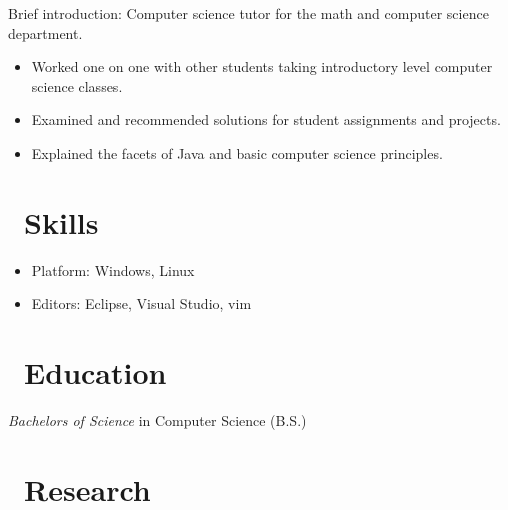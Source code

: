 \documentclass{resume}
\begin{document}
Brief introduction: Computer science tutor for the math and computer science department.
\begin{itemize}
  \item Worked one on one with other students taking introductory level computer science classes.
  \item Examined and recommended solutions for student assignments and projects.
  \item Explained the facets of Java and basic computer science principles.
\end{itemize}


\section{\faCogs\ Skills}
\begin{itemize}[parsep=0.5ex]
  \item Platform: Windows, Linux
  \item Editors: Eclipse, Visual Studio, vim
\end{itemize}

\section{\faGraduationCap\ Education}
\textit{Bachelors of Science} in Computer Science (B.S.)

\section{\faVial\ Research}



%
%
\end{document}
